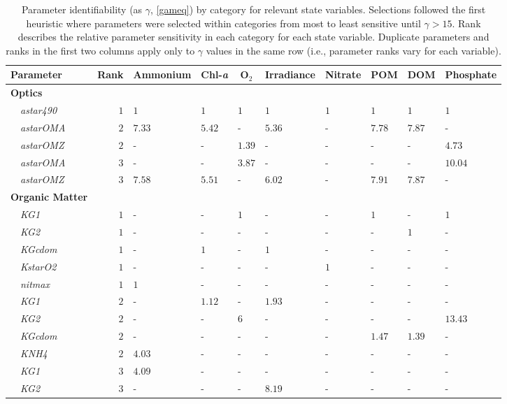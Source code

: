 \documentclass[review]{elsarticle}\usepackage[]{graphicx}\usepackage[]{color}
\begin{document}
\begin{table}[!tbp]
{\scriptsize
\caption{Parameter identifiability (as $\gamma$, \cref{gameq}) by category for relevant state variables.  Selections followed the first heuristic where parameters were selected within categories from most to least sensitive until $\gamma > 15$.  Rank describes the relative parameter sensitivity in each category for each state variable. Duplicate parameters and ranks in the first two columns apply only to $\gamma$ values in the same row (i.e., parameter ranks vary for each variable).\label{tab:heurist1}} 
\begin{center}
\begin{tabular}{lrllllllll}
\hline\hline
\multicolumn{1}{l}{Parameter}&\multicolumn{1}{c}{Rank}&\multicolumn{1}{c}{Ammonium}&\multicolumn{1}{c}{Chl-\textit{a}}&\multicolumn{1}{c}{O$_2$}&\multicolumn{1}{c}{Irradiance}&\multicolumn{1}{c}{Nitrate}&\multicolumn{1}{c}{POM}&\multicolumn{1}{c}{DOM}&\multicolumn{1}{c}{Phosphate}\tabularnewline
\hline
{\bfseries Optics}&&&&&&&&&\tabularnewline
~~\scriptsize{\textit{astar490}}&$1$&$1$&$1$&$1$&$1$&$1$&$1$&$1$&$1$\tabularnewline
~~\scriptsize{\textit{astarOMA}}&$2$&$7.33$&$5.42$&-&$5.36$&-&$7.78$&$7.87$&-\tabularnewline
~~\scriptsize{\textit{astarOMZ}}&$2$&-&-&$1.39$&-&-&-&-&$4.73$\tabularnewline
~~\scriptsize{\textit{astarOMA}}&$3$&-&-&$3.87$&-&-&-&-&$10.04$\tabularnewline
~~\scriptsize{\textit{astarOMZ}}&$3$&$7.58$&$5.51$&-&$6.02$&-&$7.91$&$7.87$&-\tabularnewline
\hline
{\bfseries Organic Matter}&&&&&&&&&\tabularnewline
~~\scriptsize{\textit{KG1}}&$1$&-&-&$1$&-&-&$1$&-&$1$\tabularnewline
~~\scriptsize{\textit{KG2}}&$1$&-&-&-&-&-&-&$1$&-\tabularnewline
~~\scriptsize{\textit{KGcdom}}&$1$&-&$1$&-&$1$&-&-&-&-\tabularnewline
~~\scriptsize{\textit{KstarO2}}&$1$&-&-&-&-&$1$&-&-&-\tabularnewline
~~\scriptsize{\textit{nitmax}}&$1$&$1$&-&-&-&-&-&-&-\tabularnewline
~~\scriptsize{\textit{KG1}}&$2$&-&$1.12$&-&$1.93$&-&-&-&-\tabularnewline
~~\scriptsize{\textit{KG2}}&$2$&-&-&$6$&-&-&-&-&$13.43$\tabularnewline
~~\scriptsize{\textit{KGcdom}}&$2$&-&-&-&-&-&$1.47$&$1.39$&-\tabularnewline
~~\scriptsize{\textit{KNH4}}&$2$&$4.03$&-&-&-&-&-&-&-\tabularnewline
~~\scriptsize{\textit{KG1}}&$3$&$4.09$&-&-&-&-&-&-&-\tabularnewline
~~\scriptsize{\textit{KG2}}&$3$&-&-&-&$8.19$&-&-&-&-\tabularnewline

\end{tabular}
\end{center}}
\end{table}
\end{document}
